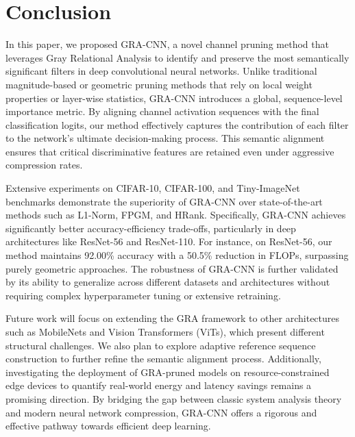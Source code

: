 \section{Conclusion}

In this paper, we proposed GRA-CNN, a novel channel pruning method that leverages Gray Relational Analysis to identify and preserve the most semantically significant filters in deep convolutional neural networks. Unlike traditional magnitude-based or geometric pruning methods that rely on local weight properties or layer-wise statistics, GRA-CNN introduces a global, sequence-level importance metric. By aligning channel activation sequences with the final classification logits, our method effectively captures the contribution of each filter to the network's ultimate decision-making process. This semantic alignment ensures that critical discriminative features are retained even under aggressive compression rates.

Extensive experiments on CIFAR-10, CIFAR-100, and Tiny-ImageNet benchmarks demonstrate the superiority of GRA-CNN over state-of-the-art methods such as L1-Norm, FPGM, and HRank. Specifically, GRA-CNN achieves significantly better accuracy-efficiency trade-offs, particularly in deep architectures like ResNet-56 and ResNet-110. For instance, on ResNet-56, our method maintains 92.00\% accuracy with a 50.5\% reduction in FLOPs, surpassing purely geometric approaches. The robustness of GRA-CNN is further validated by its ability to generalize across different datasets and architectures without requiring complex hyperparameter tuning or extensive retraining.

Future work will focus on extending the GRA framework to other architectures such as MobileNets and Vision Transformers (ViTs), which present different structural challenges. We also plan to explore adaptive reference sequence construction to further refine the semantic alignment process. Additionally, investigating the deployment of GRA-pruned models on resource-constrained edge devices to quantify real-world energy and latency savings remains a promising direction. By bridging the gap between classic system analysis theory and modern neural network compression, GRA-CNN offers a rigorous and effective pathway towards efficient deep learning.
